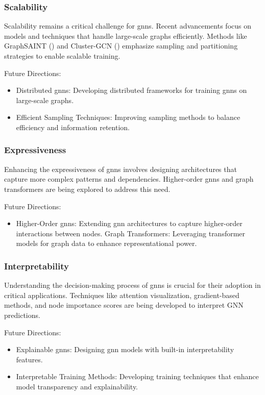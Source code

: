 \subsubsection*{Scalability}

Scalability remains a critical challenge for \glspl{gnn}. Recent advancements focus on models and techniques that handle large-scale graphs efficiently. Methods like GraphSAINT (\cite{Zeng2019}) and Cluster-GCN (\cite{Chiang2019}) emphasize sampling and partitioning strategies to enable scalable training.

Future Directions:
\begin{itemize}
    \item Distributed \glspl{gnn}: Developing distributed frameworks for training \glspl{gnn} on large-scale graphs.
    \item Efficient Sampling Techniques: Improving sampling methods to balance efficiency and information retention.
\end{itemize}


\subsubsection*{Expressiveness}

Enhancing the expressiveness of \glspl{gnn} involves designing architectures that capture more complex patterns and dependencies. Higher-order \glspl{gnn} and graph transformers are being explored to address this need.

Future Directions:
\begin{itemize}
    \item Higher-Order \glspl{gnn}: Extending \gls{gnn} architectures to capture higher-order interactions between nodes.
    Graph Transformers: Leveraging transformer models for graph data to enhance representational power.
\end{itemize}

\subsubsection*{Interpretability}

Understanding the decision-making process of \glspl{gnn} is crucial for their adoption in critical applications. Techniques like attention visualization, gradient-based methods, and node importance scores are being developed to interpret GNN predictions.

Future Directions:
\begin{itemize}
    \item Explainable \glspl{gnn}: Designing \gls{gnn} models with built-in interpretability features.
    \item Interpretable Training Methods: Developing training techniques that enhance model transparency and explainability.
\end{itemize}

